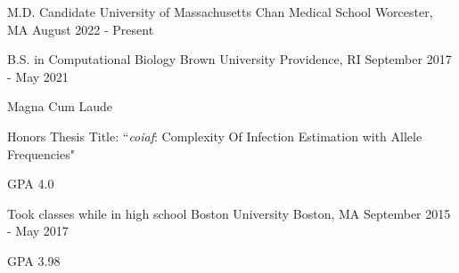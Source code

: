 
\begin{cventries}

  \cventry
    {M.D. Candidate} %
    {University of Massachusetts Chan Medical School} %
    {Worcester, MA} %
    {August 2022 - Present} %
    {}

  \cventry
    {B.S. in Computational Biology} %
    {Brown University} %
    {Providence, RI} %
    {September 2017 - May 2021} %
    {
      \begin{cvitems}
        \item {Magna Cum Laude}
        \item{Honors Thesis Title: ``\textit{coiaf}: Complexity Of Infection
        Estimation with Allele Frequencies"}
        \item {GPA 4.0}
      \end{cvitems}
    }
  
  \cventry
    {Took classes while in high school} %
    {Boston University} %
    {Boston, MA} %
    {September 2015 - May 2017} %
    {
      \begin{cvitems}
        \item {GPA 3.98}
      \end{cvitems}
    }
    
\end{cventries}
